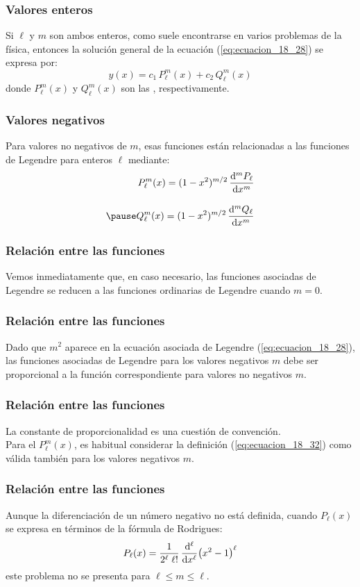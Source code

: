 \documentclass[12pt]{beamer}
\begin{document}
\begin{frame}
\frametitle{Valores enteros}
Si $\ell$ y $m$ son ambos enteros, como suele encontrarse en varios problemas de la física, \pause entonces la solución general de la ecuación (\ref{eq:ecuacion_18_28}) se expresa por:
\pause
\begin{equation}
y (x) = c_{1} \, P_{\ell}^{m} (x) + c_{2} \, Q_{\ell}^{m} (x)
\label{eq:ecuacion_18_31}
\end{equation}
\pause
donde $P_{\ell}^{m} (x)$ y $Q_{\ell}^{m} (x)$ son las , respectivamente.
\end{frame}
\begin{frame}
\frametitle{Valores negativos}    
Para valores no negativos de $m$, esas funciones están relacionadas a las funciones de Legendre para enteros $\ell$ mediante:
\pause
\begin{eqnarray}
\begin{aligned}
P_{\ell}^{m} (x) = (1 - x^{2})^{m/2} \, \dv[m]{P_{\ell}}{x} \\[1em] \pause
Q_{\ell}^{m} (x) = (1 - x^{2})^{m/2} \, \dv[m]{Q_{\ell}}{x}
\end{aligned}
\label{eq:ecuacion_18_32}
\end{eqnarray}
\end{frame}
\begin{frame}
\frametitle{Relación entre las funciones}
Vemos inmediatamente que, en caso necesario, las funciones asociadas de Legendre se reducen a las funciones ordinarias de Legendre cuando $m = 0$.
\end{frame}
\begin{frame}
\frametitle{Relación entre las funciones}
Dado que $m^{2}$ aparece en la ecuación asociada de Legendre (\ref{eq:ecuacion_18_28}), las funciones asociadas de Legendre para los valores negativos $m$ debe ser proporcional a la función correspondiente para valores no negativos $m$. 
\end{frame}
\begin{frame}
\frametitle{Relación entre las funciones}
La constante de proporcionalidad es una cuestión de convención.
\\
\bigskip
\pause
Para el $P_{\ell}^{m} (x) $, es habitual considerar la definición (\ref{eq:ecuacion_18_32}) como válida también para los valores negativos $m$.
\end{frame}
\begin{frame}
\frametitle{Relación entre las funciones}
Aunque la diferenciación de un número negativo no está definida, cuando $P_{\ell} (x)$ se expresa en términos de la fórmula de Rodrigues:
\pause
\begin{align*}
P_{\ell} (x) = \dfrac{1}{2^{\ell} \; \ell !} \, \dv[\ell]{x}  (x^{2} - 1)^{\ell}    
\end{align*}
este problema no se presenta para $\ell \leq m \leq \ell$. 
\end{frame}
\end{document}
